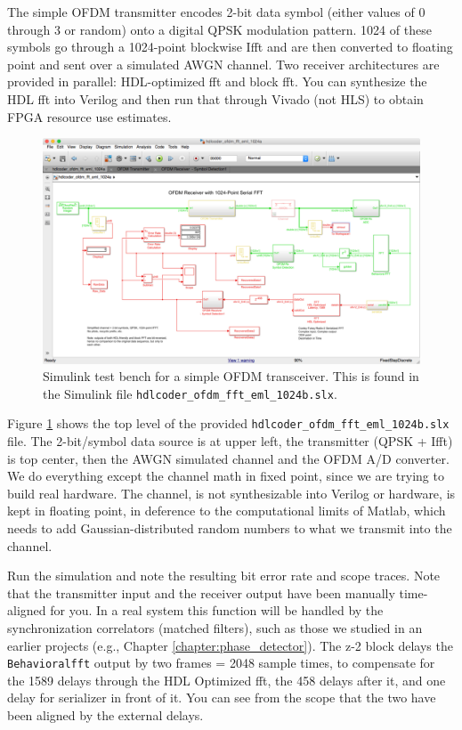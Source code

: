The simple OFDM transmitter encodes 2-bit data symbol (either values of 0 through 3 or random) onto a digital QPSK modulation pattern. 1024 of these symbols go through a 1024-point blockwise I\gls{fft} and are then converted to floating point and sent over a simulated AWGN channel. Two receiver architectures are provided in parallel: HDL-optimized \gls{fft} and block \gls{fft}. You can synthesize the HDL \gls{fft} into Verilog and then run that through Vivado (not HLS) to obtain FPGA resource use estimates.

\begin{figure}
\centering
\includegraphics[width=5.5in]{images/ofdm_1024a}
\caption{Simulink test bench for a simple OFDM transceiver. This is found in the Simulink file \texttt{hdlcoder\_ofdm\_fft\_eml\_1024b.slx}.}
\label{fig:ofdm_1024a}
\end{figure}

Figure \ref{fig:ofdm_1024a} shows the top level of the provided \texttt{hdlcoder\_ofdm\_fft\_eml\_1024b.slx} file. The 2-bit/symbol data source is at upper left, the transmitter (QPSK + I\gls{fft}) is top center, then the AWGN simulated channel and the OFDM A/D converter. We do everything except the channel math in fixed point, since we are trying to build real hardware. The channel, is not synthesizable into Verilog or hardware, is kept in floating point, in deference to the computational limits of Matlab, which needs to add Gaussian-distributed random numbers to what we transmit into the channel.

Run the simulation and note the resulting bit error rate and scope traces. Note that the transmitter input and the receiver output have been manually time-aligned for you. In a real system this function will be handled by the synchronization correlators (matched filters), such as those we studied in an earlier projects (e.g., Chapter \ref{chapter:phase_detector}). The z-2 block delays the \texttt{Behavioral\gls{fft}} output by two frames = 2048 sample times, to compensate for the 1589 delays through the HDL Optimized \gls{fft}, the 458 delays after it, and one delay for serializer in front of it. You can see from the scope that the two have been aligned by the external delays.

